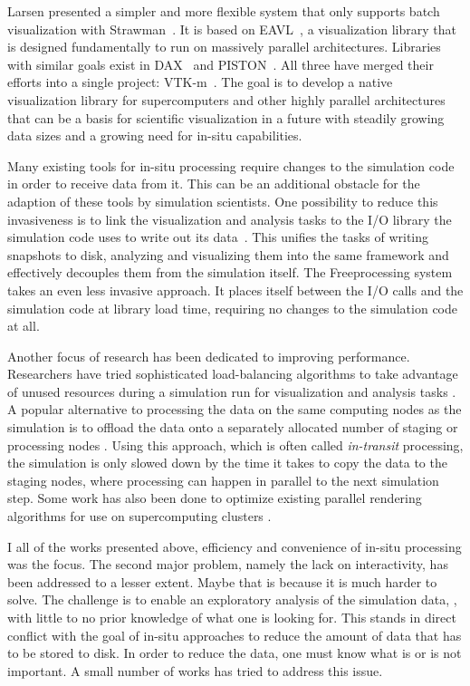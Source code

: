 %
Larsen \etal presented a simpler and more flexible system that only supports
batch visualization with Strawman~\cite{Larsen2015}.
%
It is based on EAVL~\cite{Meredith2012}, a visualization library that is
designed fundamentally to run on massively parallel architectures.
%
Libraries with similar goals exist in DAX~\cite{Moreland2011} and
PISTON~\cite{Lo2012}.
%
All three have merged their efforts into a single project:
VTK-m~\cite{Moreland2016}.
%
The goal is to develop a native visualization library for supercomputers and
other highly parallel architectures that can be a basis for scientific
visualization in a future with steadily growing data sizes and a growing need
for in-situ capabilities.
%

%
Many existing tools for in-situ processing require changes to the simulation
code in order to receive data from it.
%
This can be an additional obstacle for the adaption of these tools by simulation
scientists.
%
One possibility to reduce this invasiveness is to link the visualization and
analysis tasks to the I/O library the simulation code uses to write out its
data~\cite{Vishwanath2011,Biddiscombe2011,Dorier2013}.
%
This unifies the tasks of writing snapshots to disk, analyzing and visualizing
them into the same framework and effectively decouples them from the simulation
itself.
%
The Freeprocessing system~\cite{Fogal2014} takes an even less invasive approach.
%
It places itself between the I/O calls and the simulation code at library load
time, requiring no changes to the simulation code at all.
%

%
Another focus of research has been dedicated to improving performance.
%
Researchers have tried sophisticated load-balancing algorithms to take advantage
of unused resources during a simulation run for visualization and analysis tasks
\cite{Zheng2013}.
%
A popular alternative to processing the data on the same computing nodes as the
simulation is to offload the data onto a separately allocated number of staging
or processing
nodes \cite{Zheng2010,Abbasi2010,Abbasi2011,Docan2011,Docan2012,Bennett2012}.
%
Using this approach, which is often called \emph{in-transit} processing, the
simulation is only slowed down by the time it takes to copy the data to the
staging nodes, where processing can happen in parallel to the next simulation
step.
%
Some work has also been done to optimize existing parallel rendering algorithms
for use on supercomputing
clusters \cite{Yu2008,Kendall2010,Moreland2011a,Cavin2012,Nonaka2014,Grosset2016}.
%

%
I all of the works presented above, efficiency and convenience of in-situ
processing was the focus.
%
The second major problem, namely the lack on interactivity, has been addressed
to a lesser extent.
%
Maybe that is because it is much harder to solve.
%
The challenge is to enable an exploratory analysis of the simulation data, \ie,
with little to no prior knowledge of what one is looking for.
%
This stands in direct conflict with the goal of in-situ approaches to reduce the
amount of data that has to be stored to disk.
%
In order to reduce the data, one must know what is or is not important.
%
A small number of works has tried to address this issue.
%

